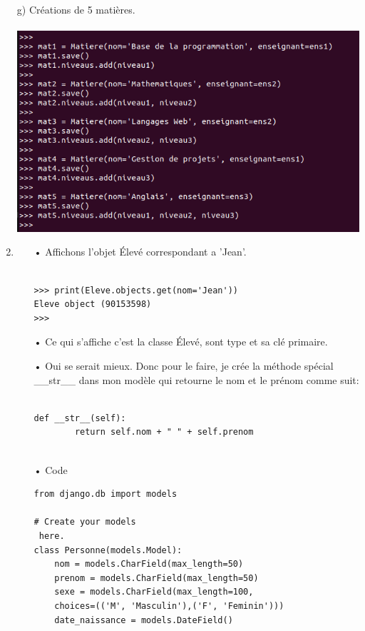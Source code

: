 \documentclass[10pt,a4paper]{article}
\begin{document}
\begin{enumerate}
\item[g)] Créations de 5 matières.\\\\
\includegraphics[scale=0.5]{n4.png}\\



\item 
\begin{itemize}
\item[]

\item[•]Affichons l'objet Élevé correspondant a 'Jean'.\\\\
\begin{verbatim}
>>> print(Eleve.objects.get(nom='Jean'))
Eleve object (90153598)
>>> 
\end{verbatim}
\item[•] Ce qui s'affiche c'est la classe Élevé, sont type et sa clé primaire.

\item[•] Oui se serait mieux. Donc pour le faire, je crée la méthode spécial \_\_str\_\_ dans mon modèle qui retourne le nom et le prénom comme suit: \\

\begin{verbatim}

def __str__(self):
        return self.nom + " " + self.prenom
        
\end{verbatim}

\item[•] Code
\begin{verbatim}
from django.db import models

# Create your models
 here.
class Personne(models.Model):
    nom = models.CharField(max_length=50)
    prenom = models.CharField(max_length=50)
    sexe = models.CharField(max_length=100, 
    choices=(('M', 'Masculin'),('F', 'Feminin'))) 
    date_naissance = models.DateField()


\end{verbatim}
\end{itemize}
\end{enumerate}
\end{document}
